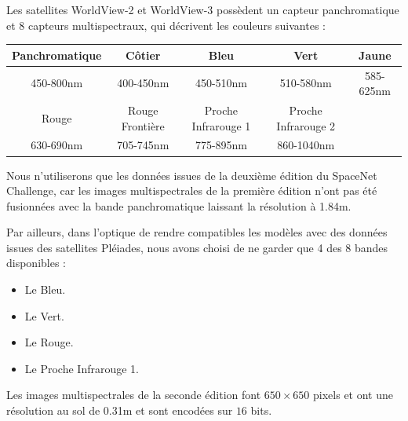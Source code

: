 \documentclass[a4paper, 11pt]{report}
\begin{document}
Les satellites WorldView-2 et WorldView-3 possèdent un capteur panchromatique et $8$ capteurs multispectraux, qui décrivent les couleurs suivantes :
\begin{center}
	\begin{tabular}{|c|c|c|c|c|}
	\hline 
	Panchromatique & Côtier & Bleu & Vert & Jaune \\ 
	\hline 
	450-800nm & 400-450nm & 450-510nm & 510-580nm & 585-625nm \\ 
	\hline 
	Rouge & Rouge Frontière & Proche Infrarouge 1 & Proche Infrarouge 2 & \\ 
	\hline 
	630-690nm & 705-745nm & 775-895nm & 860-1040nm & \\ 
	\hline 
	\end{tabular}
\end{center}

Nous n'utiliserons que les données issues de la deuxième édition du SpaceNet Challenge, car les images multispectrales de la première édition n'ont pas été fusionnées avec la bande panchromatique laissant la résolution à 1.84m.

Par ailleurs, dans l'optique de rendre compatibles les modèles avec des données issues des satellites Pléiades, nous avons choisi de ne garder que 4 des 8 bandes disponibles :
\begin{itemize}
	\item Le Bleu.
	\item Le Vert.
	\item Le Rouge.
	\item Le Proche Infrarouge 1.
\end{itemize}

Les images multispectrales de la seconde édition font $650 \times 650$ pixels et ont une résolution au sol de 0.31m et sont encodées sur $16$ bits.
\end{document}
